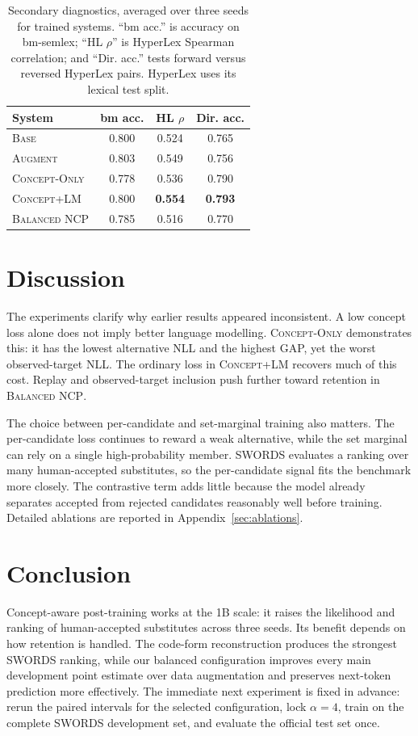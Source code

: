 \documentclass[11pt]{article}
\newcommand{\base}{\textsc{Base}}
\newcommand{\aug}{\textsc{Augment}}
\newcommand{\peq}{\textsc{Concept-Only}}
\newcommand{\pcode}{\textsc{Concept+LM}}
\newcommand{\method}{\textsc{Balanced NCP}}
\begin{document}
\begin{table}[t]
\centering\footnotesize\setlength{\tabcolsep}{3.5pt}
\begin{tabular}{lccc}
\toprule
System & bm acc. & HL $\rho$ & Dir. acc. \\
\midrule
\base{} & 0.800 & 0.524 & 0.765 \\
\aug{} & 0.803 & 0.549 & 0.756 \\
\peq{} & 0.778 & 0.536 & 0.790 \\
\pcode{} & 0.800 & \textbf{0.554} & \textbf{0.793} \\
\method{} & 0.785 & 0.516 & 0.770 \\
\bottomrule
\end{tabular}
\caption{Secondary diagnostics, averaged over three seeds for trained systems.
``bm acc.'' is accuracy on bm-semlex; ``HL $\rho$'' is HyperLex Spearman
correlation; and ``Dir. acc.'' tests forward versus reversed HyperLex pairs.
HyperLex uses its lexical test split.}
\label{tab:secondary}
\end{table}

\section{Discussion}

The experiments clarify why earlier results appeared inconsistent. A low concept
loss alone does not imply better language modelling. \peq{} demonstrates this:
it has the lowest alternative NLL and the highest GAP, yet the worst
observed-target NLL. The ordinary loss in \pcode{} recovers much of this cost.
Replay and observed-target inclusion push further toward retention in \method{}.

The choice between per-candidate and set-marginal training also matters. The
per-candidate loss continues to reward a weak alternative, while the set marginal
can rely on a single high-probability member. SWORDS evaluates a ranking over many
human-accepted substitutes, so the per-candidate signal fits the benchmark more
closely. The contrastive term adds little because the model already separates
accepted from rejected candidates reasonably well before training. Detailed
ablations are reported in Appendix~\ref{sec:ablations}.

\section{Conclusion}

Concept-aware post-training works at the 1B scale: it raises the likelihood and
ranking of human-accepted substitutes across three seeds. Its benefit depends on
how retention is handled. The code-form reconstruction produces the strongest
SWORDS ranking, while our balanced configuration improves every main development
point estimate over data augmentation and preserves next-token prediction more
effectively. The immediate next experiment is fixed in advance: rerun the paired
intervals for the selected configuration, lock $\alpha=4$, train on the complete
SWORDS development set, and evaluate the official test set once.
\end{document}
